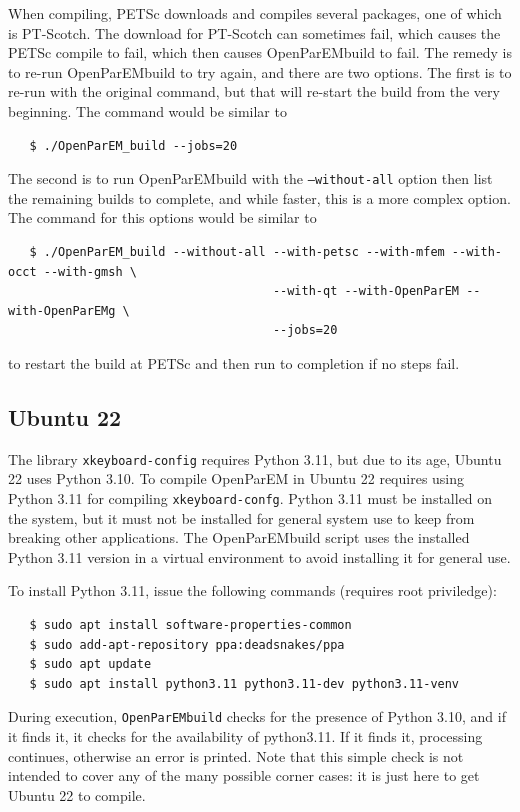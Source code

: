 \documentclass[titlepage]{article}
\renewcommand\_{\textunderscore\linebreak[1]}
\begin{document}
When compiling, PETSc\cite{PETSc} downloads and compiles several packages, one of which is PT-Scotch\cite{PTSCOTCH}.  The download for PT-Scotch can sometimes fail, which causes the PETSc compile to fail, which then causes OpenParEM\_build to fail.  The remedy is to re-run OpenParEM\_build to try again, and there are two options.  The first is to re-run with the original command, but that will re-start the build from the very beginning.  The command would be similar to
\begin{verbatim}
   $ ./OpenParEM_build --jobs=20
\end{verbatim}
\noindent  The second is to run OpenParEM\_build with the \texttt{--without-all} option then list the remaining builds to complete, and while faster, this is a more complex option.  The command for this options would be similar to
\begin{verbatim}
   $ ./OpenParEM_build --without-all --with-petsc --with-mfem --with-occt --with-gmsh \
                                     --with-qt --with-OpenParEM --with-OpenParEMg \
                                     --jobs=20
\end{verbatim}
\noindent to restart the build at PETSc and then run to completion if no steps fail.

\subsection{Ubuntu 22}
\label{sec:Ubuntu22}

The library \texttt{xkeyboard-config} requires Python 3.11, but due to its age, Ubuntu 22 uses Python 3.10.  To compile OpenParEM in Ubuntu 22 requires using Python 3.11 for compiling \texttt{xkeyboard-confg}.  Python 3.11 must be installed on the system, but it must not be installed for general system use to keep from breaking other applications.  The OpenParEM\_build script uses the installed Python 3.11 version in a virtual environment to avoid installing it for general use.

To install Python 3.11, issue the following commands (requires root priviledge):
\begin{verbatim}
   $ sudo apt install software-properties-common
   $ sudo add-apt-repository ppa:deadsnakes/ppa
   $ sudo apt update
   $ sudo apt install python3.11 python3.11-dev python3.11-venv
\end{verbatim}

During execution, \texttt{OpenParEM\_build} checks for the presence of Python 3.10, and if it finds it, it checks for the availability of python3.11.  If it finds it, processing continues, otherwise an error is printed.  Note that this simple check is not intended to cover any of the many possible corner cases: it is just here to get Ubuntu 22 to compile.
\end{document}
